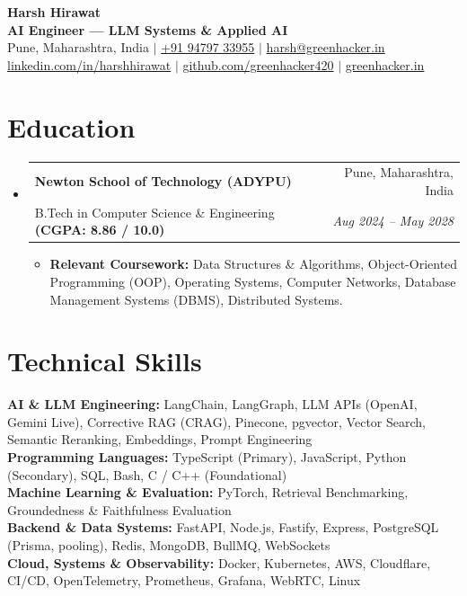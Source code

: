\documentclass[a4paper,10pt]{article}
\makeatletter
\newcommand{\resumeItem}[1]{
  \item\small{#1 \vspace{-1.2pt}}
}
\newcommand{\resumeSubheading}[4]{
  \item
    \begin{tabular*}{\linewidth}[t]{l@{\extracolsep{\fill}}r}
      \textbf{#1} & #2 \\
      \small#3 & \textit{\small #4} \\
    \end{tabular*}\vspace{-2pt}
}
\newcommand{\resumeSubHeadingListStart}{\begin{itemize}[leftmargin=0.06in, label={}]}
\newcommand{\resumeSubHeadingListEnd}{\end{itemize}\vspace{-2pt}}
\newcommand{\resumeItemListStart}{\begin{itemize}[leftmargin=0.14in]}
\newcommand{\resumeItemListEnd}{\end{itemize}\vspace{2.5pt}}
\makeatother
\begin{document}

\begin{center}
    {\Huge \textbf{Harsh Hirawat}} \\ \vspace{1.5pt}
    {\large \textbf{AI Engineer --- LLM Systems \& Applied AI}} \\ \vspace{2pt}
    \small
    Pune, Maharashtra, India \quad $|$ \quad
    \href{tel:+919479733955}{+91 94797 33955} \quad $|$ \quad
    \href{mailto:harsh@greenhacker.in}{harsh@greenhacker.in} \\ \vspace{1.5pt}
    \href{https://linkedin.com/in/harshhirawat}{linkedin.com/in/harshhirawat} \quad $|$ \quad
    \href{https://github.com/greenhacker420}{github.com/greenhacker420} \quad $|$ \quad
    \href{https://greenhacker.in}{greenhacker.in}
\end{center}
\vspace{-12pt}

\section{Education}
  \resumeSubHeadingListStart
    \resumeSubheading
      {Newton School of Technology (ADYPU)}{Pune, Maharashtra, India}
      {B.Tech in Computer Science \& Engineering \textbf{(CGPA: 8.86 / 10.0)}}{Aug 2024 -- May 2028}
      \resumeItemListStart
        \resumeItem{\textbf{Relevant Coursework:} Data Structures \& Algorithms, Object-Oriented Programming (OOP), Operating Systems, Computer Networks, Database Management Systems (DBMS), Distributed Systems.}
      \resumeItemListEnd
  \resumeSubHeadingListEnd

\section{Technical Skills}
\begin{itemize}[leftmargin=0.06in, label={}]
    \small{\item{
     \textbf{AI \& LLM Engineering:} LangChain, LangGraph, LLM APIs (OpenAI, Gemini Live), Corrective RAG (CRAG), Pinecone, pgvector, Vector Search, Semantic Reranking, Embeddings, Prompt Engineering \\
     \textbf{Programming Languages:} TypeScript (Primary), JavaScript, Python (Secondary), SQL, Bash, C / C++ (Foundational) \\
     \textbf{Machine Learning \& Evaluation:} PyTorch, Retrieval Benchmarking, Groundedness \& Faithfulness Evaluation \\
     \textbf{Backend \& Data Systems:} FastAPI, Node.js, Fastify, Express, PostgreSQL (Prisma, pooling), Redis, MongoDB, BullMQ, WebSockets \\
     \textbf{Cloud, Systems \& Observability:} Docker, Kubernetes, AWS, Cloudflare, CI/CD, OpenTelemetry, Prometheus, Grafana, WebRTC, Linux
    }}
\end{itemize}
\vspace{-4pt}
\end{document}
